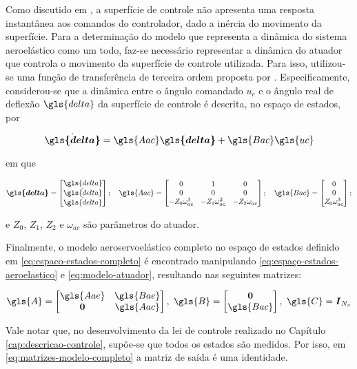 Como discutido em \textcite{art:Huang-2015}, a superfície de controle não apresenta uma resposta instantânea aos comandos do controlador, dado a inércia do movimento da superfície. Para a determinação do modelo que representa a dinâmica do sistema aeroelástico como um todo, faz-se necessário representar a dinâmica do atuador que controla o movimento da superfície de controle utilizada. Para isso, utilizou-se uma função de transferência de terceira ordem proposta por \textcite{art:Huang-2015, ZAERO-Theoretical-Manual:2017}. Especificamente, considerou-se que a dinâmica entre o ângulo comandado $u_{c}$ e o ângulo real de deflexão $\gls{delta}$ da superfície de controle é descrita, no espaço de estados, por

\begin{equation}\label{eq:modelo-atuador}
    \dot{\boldsymbol{\gls{delta}}} = \gls{Aac}\boldsymbol{\gls{delta}} + \gls{Bac}\gls{uc}
\end{equation}

\noindent em que

\begin{equation}\label{eq:matrizes-modelo-atuador}
    \boldsymbol{\gls{delta}} = \begin{bmatrix}
        \gls{delta} \\ \dot{\gls{delta}} \\ \ddot{\gls{delta}}
    \end{bmatrix}; \quad
    \gls{Aac} = 
    \begin{bmatrix}
    0 & 1 & 0 \\
    0 & 0 & 0 \\
    -Z_{0}\omega_{ac}^{3} & -Z_{1}\omega_{ac}^{2} & -Z_{2}\omega_{ac}
    \end{bmatrix}; \quad
    \gls{Bac} = 
    \begin{bmatrix}
    0 \\ 0 \\ Z_{0}\omega_{ac}^{3}
    \end{bmatrix};
\end{equation}

\noindent e $Z_{0}$, $Z_{1}$, $Z_{2}$ e $\omega_{ac}$ são parâmetros do atuador.

Finalmente, o modelo aeroservoelástico completo no espaço de estados definido em \eqref{eq:espaco-estados-completo} é encontrado manipulando \eqref{eq:espaço-estados-aeroelastico} e \eqref{eq:modelo-atuador}, resultando nas seguintes matrizes:

\begin{equation}\label{eq:matrizes-modelo-completo}
    \gls{A} = \begin{bmatrix}
        \gls{Aae} & \gls{Bae} \\
        \boldsymbol{0}      & \gls{Aac}
    \end{bmatrix}, \  
    \gls{B} = \begin{bmatrix}
        \boldsymbol{0} \\ \gls{Bac}
    \end{bmatrix}, \ 
    \gls{C} = \boldsymbol{I}_{N_{x}}
\end{equation}

Vale notar que, no desenvolvimento da lei de controle realizado no Capítulo \ref{cap:descricao-controle}, supõe-se que todos os estados são medidos. Por isso, em \eqref{eq:matrizes-modelo-completo} a matriz de saída é uma identidade.

